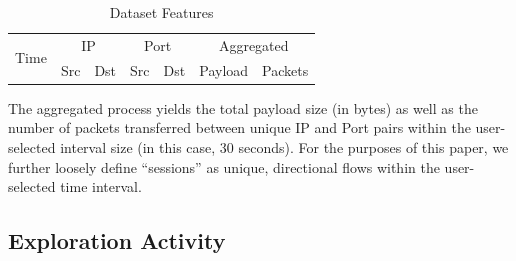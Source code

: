\begin{table}[htbp]
\centering
\caption{Dataset Features}
\label{tab:dataset}
\begin{tabular}{|c|c|c|c|c|c|c|}
\hline
\multirow{2}{*}{Time} & \multicolumn{2}{c|}{IP} & \multicolumn{2}{c|}{Port} & \multicolumn{2}{c|}{Aggregated} \\ \cline{2-7} 
 & Src & Dst & Src & Dst & Payload & Packets \\ \hline
\end{tabular}
\end{table}

The aggregated process yields the total payload size (in bytes) as well as the number of packets transferred between unique IP and Port pairs within the user-selected interval size (in this case, 30 seconds). For the purposes of this paper, we further loosely define ``sessions'' as unique, directional flows within the user-selected time interval.

\subsection{Exploration Activity}

